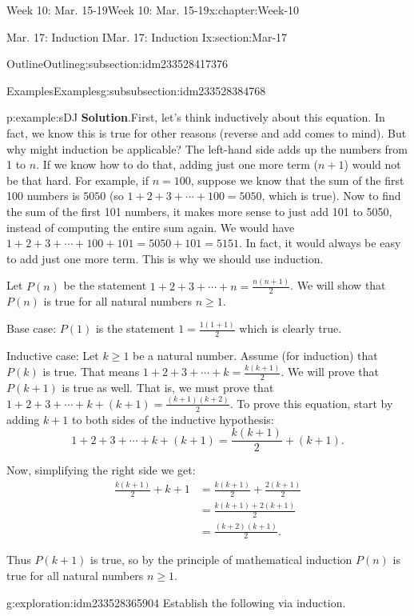 \documentclass[oneside,10pt,]{book}
\newcommand{\blocktitlefont}{\relax}
\numberwithin{equation}{section}
\renewcommand{\ge}{\geqslant}
\newcommand{\amp}{&}
\begin{document}
\begin{chapterptx}{Week 10: Mar. 15-19}{}{Week 10: Mar. 15-19}{}{}{x:chapter:Week-10}
\begin{sectionptx}{Mar. 17: Induction I}{}{Mar. 17: Induction I}{}{}{x:section:Mar-17}
\begin{subsectionptx}{Outline}{}{Outline}{}{}{g:subsection:idm233528417376}
\begin{subsubsectionptx}{Examples}{}{Examples}{}{}{g:subsubsection:idm233528384768}
\begin{example}{}{p:example:sDJ}
\noindent\textbf{\blocktitlefont Solution}.\hypertarget{p:solution:JBU}{}\quad{}First, let's think inductively about this equation. In fact, we know this is true for other reasons (reverse and add comes to mind). But why might induction be applicable? The left-hand side adds up the numbers from 1 to \(n\). If we know how to do that, adding just one more term (\(n+1\)) would not be that hard. For example, if \(n = 100\), suppose we know that the sum of the first 100 numbers is \(5050\) (so \(1 + 2 + 3 + \cdots + 100 = 5050\), which is true). Now to find the sum of the first 101 numbers, it makes more sense to just add 101 to 5050, instead of computing the entire sum again. We would have \(1 + 2 + 3 + \cdots + 100 + 101 = 5050 + 101 = 5151\). In fact, it would always be easy to add just one more term. This is why we should use induction.%
\begin{solutionproof}
Let \(P(n)\) be the statement \(1 + 2 + 3 + \cdots + n = \frac{n(n+1)}{2}\). We will show that \(P(n)\) is true for all natural numbers \(n \ge 1\).%
\par
Base case: \(P(1)\) is the statement \(1 = \frac{1(1+1)}{2}\) which is clearly true.%
\par
Inductive case: Let \(k \ge 1\) be a natural number. Assume (for induction) that \(P(k)\) is true. That means \(1 + 2 + 3 + \cdots + k = \frac{k(k+1)}{2}\). We will prove that \(P(k+1)\) is true as well. That is, we must prove that \(1 + 2 + 3 + \cdots + k + (k+1) = \frac{(k+1)(k+2)}{2}\). To prove this equation, start by adding \(k+1\) to both sides of the inductive hypothesis:%
\begin{equation*}
1 + 2 + 3 + \cdots + k + (k+1) = \frac{k(k+1)}{2} + (k+1)\text{.}
\end{equation*}
%
\par
Now, simplifying the right side we get:%
\begin{align*}
\frac{k(k+1)}{2} + k+1 \amp = \frac{k(k+1)}{2} + \frac{2(k+1)}{2}\\
\amp = \frac{k(k+1) + 2(k+1)}{2}\\
\amp = \frac{(k+2)(k+1)}{2}\text{.}
\end{align*}
%
\par
Thus \(P(k+1)\) is true, so by the principle of mathematical induction \(P(n)\) is true for all natural numbers \(n \ge 1\).%
\end{solutionproof}
\end{example}
\begin{exploration}{}{g:exploration:idm233528365904}%
Establish the following via induction.%

\end{exploration}
\end{subsubsectionptx}
\end{subsectionptx}
\end{sectionptx}
\end{chapterptx}
\end{document}
